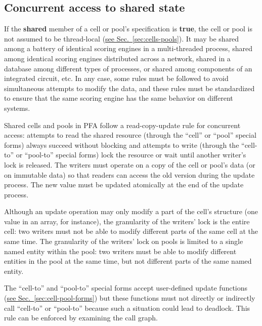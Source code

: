 \documentclass{article}
\newcommand{\PFAc}{\ttfamily\bfseries}
\theoremstyle{definition}
\begin{document}
\hypertarget{hsec:concurrent}{}
\subsection{Concurrent access to shared state}
\label{sec:concurrent}

If the {\PFAc shared} member of a cell or pool's specification is {\PFAc true}, the cell or pool is not assumed to be thread-local (\hyperlink{hsec:cells-pools}{see Sec.~\ref{sec:cells-pools}}).  It may be shared among a battery of identical scoring engines in a multi-threaded process, shared among identical scoring engines distributed across a network, shared in a database among different types of processes, or shared among components of an integrated circuit, etc.  In any case, some rules must be followed to avoid simultaneous attempts to modify the data, and these rules must be standardized to ensure that the same scoring engine has the same behavior on different systems.

Shared cells and pools in PFA follow a read-copy-update rule for concurrent access: attempts to read the shared resource (through the ``cell'' or ``pool'' special forms) always succeed without blocking and attempts to write (through the ``cell-to'' or ``pool-to'' special forms) lock the resource or wait until another writer's lock is released.  The writers must operate on a copy of the cell or pool's data (or on immutable data) so that readers can access the old version during the update process.  The new value must be updated atomically at the end of the update process.

Although an update operation may only modify a part of the cell's structure (one value in an array, for instance), the granularity of the writers' lock is the entire cell: two writers must not be able to modify different parts of the same cell at the same time.  The granularity of the writers' lock on pools is limited to a single named entity within the pool: two writers must be able to modify different entities in the pool at the same time, but not different parts of the same named entity.

The ``cell-to'' and ``pool-to'' special forms accept user-defined update functions (\hyperlink{hsec:cell-pool-forms}{see Sec.~\ref{sec:cell-pool-forms}}) but these functions must not directly or indirectly call ``cell-to'' or ``pool-to'' because such a situation could lead to deadlock.  This rule can be enforced by examining the call graph.

\hypertarget{hsec:exceptions}{}
\end{document}
